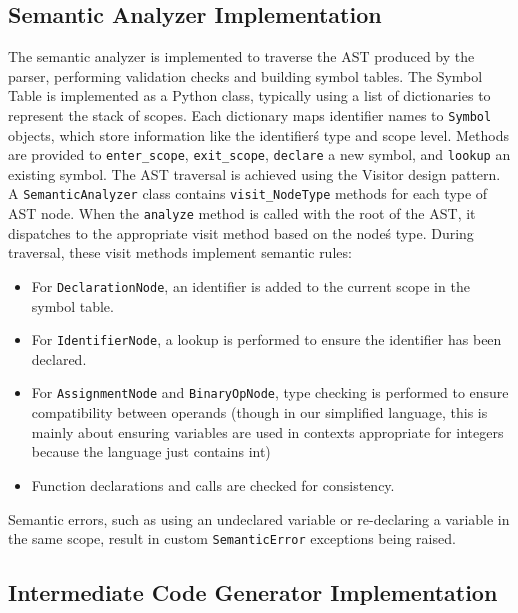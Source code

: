 \documentclass[12pt, letterpaper]{article}
\begin{document}
\subsection*{Semantic Analyzer Implementation}

The semantic analyzer is implemented to traverse the AST produced by the parser, performing validation checks and building symbol tables.\@
The Symbol Table is implemented as a Python class, typically using a list of dictionaries to represent the stack of scopes. Each dictionary maps identifier names to \texttt{Symbol} objects, which store information like the identifier\'s type and scope level. Methods are provided to \texttt{enter\_scope}, \texttt{exit\_scope}, \texttt{declare} a new symbol, and \texttt{lookup} an existing symbol.\@
The AST traversal is achieved using the Visitor design pattern. A \texttt{SemanticAnalyzer} class contains \texttt{visit\_NodeType} methods for each type of AST node. When the \texttt{analyze} method is called with the root of the AST, it dispatches to the appropriate visit method based on the node\'s type.\@
During traversal, these visit methods implement semantic rules:
\begin{itemize}
    \item For \texttt{DeclarationNode}, an identifier is added to the current scope in the symbol table.
    \item For \texttt{IdentifierNode}, a lookup is performed to ensure the identifier has been declared.
    \item For \texttt{AssignmentNode} and \texttt{BinaryOpNode}, type checking is performed to ensure compatibility between operands (though in our simplified language, this is mainly about ensuring variables are used in contexts appropriate for integers because the language just contains int)
    \item Function declarations and calls are checked for consistency.
\end{itemize}
Semantic errors, such as using an undeclared variable or re-declaring a variable in the same scope, result in custom \texttt{SemanticError} exceptions being raised.

\subsection*{Intermediate Code Generator Implementation}
\end{document}
